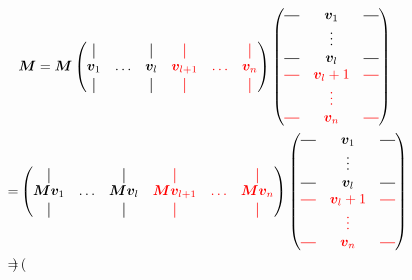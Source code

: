\begin{align}
    &\bm{M} = \bm{M}
    \begin{pmatrix}
    \vertbar &        & \vertbar & \red{\vertbar    } & \red{        }& \red{ \vertbar }\\
    \bm{v}_1 & \hdots & \bm{v}_l & \red{\bm{v}_{l+1}} & \red{ \hdots }& \red{ \bm{v}_n }\\
    \vertbar &        & \vertbar & \red{\vertbar    } & \red{        }& \red{ \vertbar }
    \end{pmatrix}
    \begin{pmatrix}
        \horzbar & \bm{v}_1   & \horzbar \\
                    & \vdots     &          \\
        \horzbar & \bm{v}_l   & \horzbar \\
        \red{\horzbar} & \red{\bm{v}_l+1} & \red{\horzbar} \\
                        & \red{\vdots    } &                \\
        \red{\horzbar} & \red{\bm{v}_n  } & \red{\horzbar} \\
    \end{pmatrix} \\
    =&
    \begin{pmatrix}
    \vertbar       &        & \vertbar       & \red{\vertbar    }       & \red{        }& \red{ \vertbar }       \\
    \bm{M}\bm{v}_1 & \hdots & \bm{M}\bm{v}_l & \red{\bm{M}\bm{v}_{l+1}} & \red{ \hdots }& \red{\bm{M} \bm{v}_n } \\
    \vertbar       &        & \vertbar       & \red{\vertbar    }       & \red{        }& \red{ \vertbar }
    \end{pmatrix}
    \begin{pmatrix}
        \horzbar & \bm{v}_1   & \horzbar \\
                    & \vdots     &          \\
        \horzbar & \bm{v}_l   & \horzbar \\
        \red{\horzbar} & \red{\bm{v}_l+1} & \red{\horzbar} \\
                        & \red{\vdots    } &                \\
        \red{\horzbar} & \red{\bm{v}_n  } & \red{\horzbar} \\
    \end{pmatrix} \\
    =&
    \begin{pmatrix}

\end{pmatrix}
\end{align}
